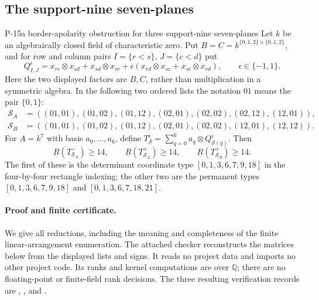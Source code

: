 \subsection{The support-nine seven-planes}
\begin{finding}{P-15}{a border-apolarity obstruction for three support-nine seven-planes}
Let $k$ be an algebraically closed field of characteristic zero.  Put
$B=C=k^{\{0,1,2\}\times\{0,1,2\}}$, and for row and column pairs
$I=\{r<s\}$, $J=\{c<d\}$ put
\[
 Q^{\epsilon}_{I,J}=
 x_{rc}\otimes x_{sd}+x_{sd}\otimes x_{rc}
 +\epsilon(x_{rd}\otimes x_{sc}+x_{sc}\otimes x_{rd}),
 \qquad \epsilon\in\{-1,1\}.
\]
Here the two displayed factors are $B,C$, rather than multiplication in a
symmetric algebra.  In the following two ordered lists the notation $01$
means the pair $\{0,1\}$:
\begin{align*}
 \mathcal S_A&=((01,01),(01,02),(01,12),(02,01),(02,02),(02,12),(12,01)),\\
 \mathcal S_B&=((01,01),(01,02),(01,12),(02,01),(02,02),(12,01),(12,12)).
\end{align*}
For $A=k^7$ with basis $a_0,\ldots,a_6$, define
$T^{\epsilon}_{\mathcal S}=\sum_{q=0}^6a_q\otimes Q^{\epsilon}_{\mathcal S(q)}$.
Then
\[
 \underline R(T^{-}_{\mathcal S_A})\ge14,\qquad
 \underline R(T^{+}_{\mathcal S_A})\ge14,\qquad
 \underline R(T^{+}_{\mathcal S_B})\ge14.
\]
The first of these is the determinant coordinate type
$[0,1,3,6,7,9,18]$ in the four-by-four rectangle indexing; the other two
are the permanent types $[0,1,3,6,7,9,18]$ and $[0,1,3,6,7,18,21]$.
\end{finding}

\paragraph{Proof and finite certificate.}
We give all reductions, including the meaning and completeness of the
finite linear-arrangement enumeration.  The attached checker
 reconstructs the matrices below
from the displayed lists and signs.  It reads no project data and imports
no other project code.  Its ranks and kernel computations are over
$\mathbb Q$; there are no floating-point or finite-field rank decisions.
The three resulting verification records are
,
, and
.

